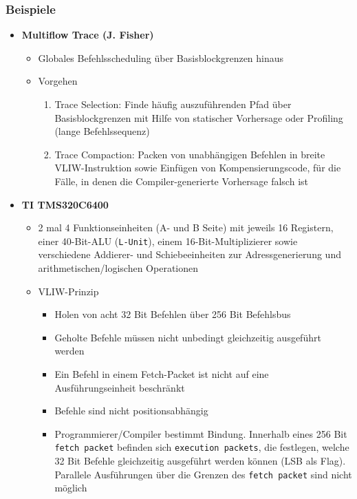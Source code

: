 \subsubsection{Beispiele}
\begin{itemize}
	\item \textbf{Multiflow Trace (J. Fisher)}
	\begin{itemize}
		\item Globales Befehlsscheduling über Basisblockgrenzen hinaus
		\item Vorgehen
		\begin{enumerate}
			\item Trace Selection: Finde häufig auszuführenden Pfad über Basisblockgrenzen mit Hilfe von statischer Vorhersage oder Profiling (lange Befehlssequenz)
			\item Trace Compaction: Packen von unabhängigen Befehlen in breite VLIW-Instruktion sowie Einfügen von Kompensierungscode, für die Fälle, in denen die Compiler-generierte Vorhersage falsch ist
		\end{enumerate}
	\end{itemize}
	\item \textbf{TI TMS320C6400}
	\begin{itemize}
		\item 2 mal 4 Funktionseinheiten (A- und B Seite) mit jeweils 16 Registern, einer 40-Bit-ALU (\texttt{L-Unit}), einem 16-Bit-Multiplizierer sowie verschiedene Addierer- und Schiebeeinheiten zur Adressgenerierung und arithmetischen/logischen Operationen
		\item VLIW-Prinzip
		\begin{itemize}
			\item Holen von acht 32 Bit Befehlen über 256 Bit Befehlsbus
			\item Geholte Befehle müssen nicht unbedingt gleichzeitig ausgeführt werden
			\item Ein Befehl in einem Fetch-Packet ist nicht auf eine Ausführungseinheit beschränkt
			\item Befehle sind nicht positionsabhängig
			\item Programmierer/Compiler bestimmt Bindung. Innerhalb eines 256 Bit \texttt{fetch packet} befinden sich \texttt{execution packets}, die festlegen, welche 32 Bit Befehle gleichzeitig ausgeführt werden können (LSB als Flag). Parallele Ausführungen über die Grenzen des \texttt{fetch packet} sind nicht möglich
		\end{itemize}
	\end{itemize}
\end{itemize}


